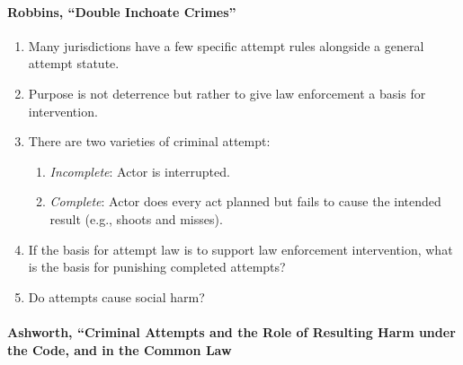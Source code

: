 \paragraph{Robbins, ``Double Inchoate Crimes''}

\begin{enumerate}
    \item Many jurisdictions have a few specific attempt rules alongside a 
    general attempt statute.
    \item Purpose is not deterrence but rather to give law enforcement a basis 
    for intervention.
    \item There are two varieties of criminal attempt:
    \begin{enumerate}
        \item \emph{Incomplete}: Actor is interrupted.
        \item \emph{Complete}: Actor does every act planned but fails to cause 
        the intended result (e.g., shoots and misses).
    \end{enumerate}
    \item If the basis for attempt law is to support law enforcement 
    intervention, what is the basis for punishing completed attempts?
    \item Do attempts cause social harm?
\end{enumerate}

\paragraph{Ashworth, ``Criminal Attempts and the Role of Resulting Harm under 
the Code, and in the Common Law}

